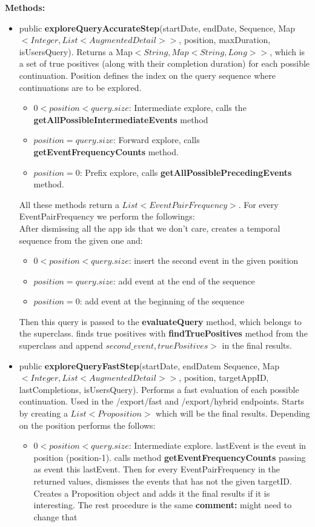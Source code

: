 \documentclass{article}
\begin{document}
\begin{itemize}
	\textbf{Methods:}
	\begin{itemize}
		\item  public \textbf{exploreQueryAccurateStep}(startDate, endDate, Sequence, Map$<Integer, List<AugmentedDetail>>$, position, maxDuration, isUsersQuery). Returns a Map$<String, Map<String, Long>>$, which is a set of true positives (along with their completion duration) for each possible continuation. Position defines the index on the query sequence where continuations are to be explored.
		\begin{itemize}
			\item $0<position<query.size$: Intermediate explore, calls the \textbf{getAllPossibleIntermediateEvents} method
			\item $position=query.size$: Forward explore, calls \textbf{getEventFrequencyCounts} method.
			\item $position=0$: Prefix explore, calls \textbf{getAllPossiblePrecedingEvents} method.
		\end{itemize}
		All these methods return a $List<EventPairFrequency>$. For every EventPairFrequency we perform the followings:\\
		 After dismissing all the app ids that we don't care, creates a temporal sequence from the given one and:
		\begin{itemize}
			\item $0<position<query.size$: insert the second event in the given position
			\item $position=query.size$: add event at the end of the sequence
			\item $position=0$: add event at the beginning of the sequence
		\end{itemize}
		Then this query is passed to the \textbf{evaluateQuery} method, which belongs to the superclass. finds true positives with \textbf{findTruePositives} method from the superclass and append $second\_event, truePositives>$ in the final results.
		\item public \textbf{exploreQueryFastStep}(startDate, endDatem Sequence, Map$<Integer, List<AugmentedDetail>>$, position, targetAppID, lastCompletions, isUsersQuery). Performs a fast evaluation of each possible continuation. Used in the /export/fast and  /export/hybrid endpoints. Starts by creating a $List<Proposition>$ which will be the final results. Depending on the position performs the follows:\\
		\begin{itemize}
			\item $0<position<query.size$: Intermediate explore. lastEvent is the event in position (position-1). calls method \textbf{getEventFrequencyCounts} passing as event this lastEvent. Then for every EventPairFrequency in the returned values, dismisses the events that has not the given targetID. Creates a Proposition object and adds it the final results if it is interesting. The rest procedure is the same \textbf{comment:} might need to change that

\end{itemize}
\end{itemize}
\end{itemize}
\end{document}
